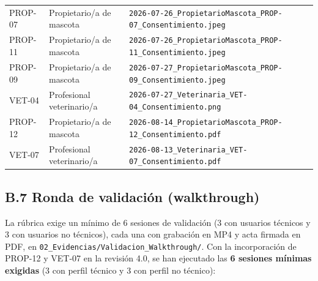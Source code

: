 \documentclass[journal,onecolumn]{IEEEtran}
\begin{document}
\begin{table}[H]
\begin{tabularx}{\textwidth}{@{}l l X@{}}
			PROP-07 & Propietario/a de mascota & \texttt{2026-07-26\_PropietarioMascota\_PROP-07\_Consentimiento.jpeg} \\
			
			PROP-11 & Propietario/a de mascota & \texttt{2026-07-26\_PropietarioMascota\_PROP-11\_Consentimiento.jpeg} \\
			
			PROP-09 & Propietario/a de mascota & \texttt{2026-07-27\_PropietarioMascota\_PROP-09\_Consentimiento.jpeg} \\
			
			VET-04 & Profesional veterinario/a & \texttt{2026-07-27\_Veterinaria\_VET-04\_Consentimiento.png} \\
			
			PROP-12 & Propietario/a de mascota & \texttt{2026-08-14\_PropietarioMascota\_PROP-12\_Consentimiento.pdf} \\
			
			VET-07 & Profesional veterinario/a & \texttt{2026-08-13\_Veterinaria\_VET-07\_Consentimiento.pdf} \\
			
			\bottomrule
		\end{tabularx}
	\end{table}
	
	
	\subsection*{B.7 Ronda de validación (walkthrough)}
	
	La rúbrica exige un mínimo de 6 sesiones de validación (3 con usuarios
	técnicos y 3 con usuarios no técnicos), cada una con grabación en MP4 y
	acta firmada en PDF, en \texttt{02\_Evidencias/Validacion\_Walkthrough/}.
	Con la incorporación de PROP-12 y VET-07 en la revisión 4.0, se han
	ejecutado las \textbf{6 sesiones mínimas exigidas} (3 con perfil técnico y
	3 con perfil no técnico):
	
\end{document}
